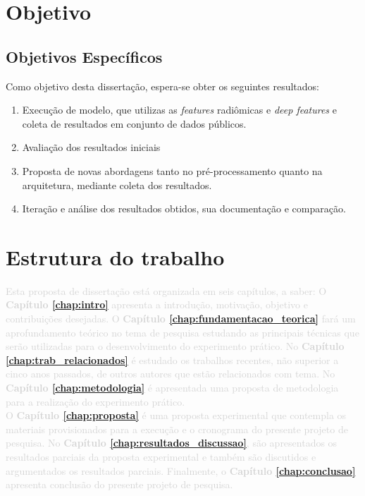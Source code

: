 \newpage


\section{Objetivo}

\subsection{Objetivos Específicos}

Como objetivo desta dissertação, espera-se obter os seguintes resultados:

\begin{enumerate}

\item Execução de modelo, que utilizas as \textit{features} radiômicas e
\textit{deep features} e coleta de resultados em conjunto de dados públicos.

\item Avaliação dos resultados iniciais

\item Proposta de novas abordagens tanto no pré-processamento quanto na arquitetura, mediante coleta dos resultados.

\item Iteração e análise dos resultados obtidos, sua documentação e comparação.
\end{enumerate}


\section{Estrutura do trabalho}

\textcolor{lightgray}{
Esta proposta de dissertação está organizada em seis capítulos, a saber:
O \textbf{Capítulo \ref{chap:intro}} apresenta a introdução, motivação, objetivo e contribuições desejadas. O \textbf{Capítulo \ref{chap:fundamentacao_teorica}} fará um aprofundamento teórico no tema de pesquisa estudando as principais técnicas que serão utilizadas para o desenvolvimento do experimento prático. No \textbf{Capítulo \ref{chap:trab_relacionados}} é estudado  os trabalhos recentes, não superior a cinco anos passados, de outros autores que estão relacionados com tema.  No \textbf{Capítulo \ref{chap:metodologia}} é apresentada uma proposta de metodologia  para a realização do experimento prático.\\ O \textbf{Capítulo \ref{chap:proposta}} é uma proposta experimental que contempla os materiais provisionados para a execução e o cronograma do presente projeto de pesquisa. No \textbf{Capítulo \ref{chap:resultados_discussao}}, são apresentados os resultados parciais da proposta experimental e também são discutidos e argumentados os resultados parciais. Finalmente, o \textbf{Capítulo \ref{chap:conclusao}} apresenta conclusão do presente projeto de pesquisa.
}
